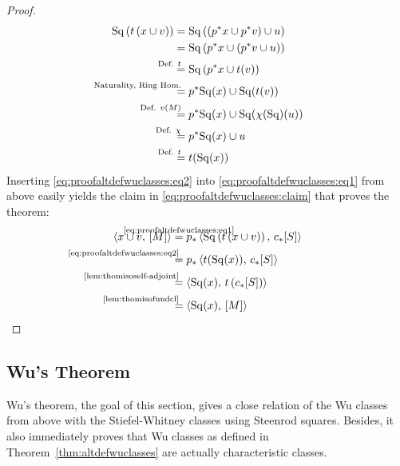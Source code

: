 \begin{Thm}
\begin{proof}
\begin{align}
      \SQ\left(\thomiso\left(x\cup\Vu\right)\right)
      &=
        \SQ\left(\left(\pb p x\cup \pb p\Vu\right) \cup \U\right)
      \\\notag
      &=
        \SQ\left(\pb p x\cup \left(\pb p\Vu \cup \U\right)\right)
      \\\notag
      &\equalsby{Def. $\thomiso$}
       \SQ\left(\pb p x\cup \thomiso(\Vu)\right)
      \\\notag
      &\equalsby{Naturality, Ring Hom.}
        \pb p\SQ(x) \cup \SQ(\thomiso(\Vu))
      \\\notag
      &\equalsby{Def. $\V{M}$}
        \pb p\SQ(x) \cup \SQ(\antipode(\SQ)(u))
      \\\notag
      &\equalsby{Def. $\antipode$}
        \pb p\SQ(x) \cup u
      \\\label{eq:proofaltdefwuclasses:eq2}
      &\equalsby{Def. $\thomiso$}
        \thomiso(\SQ(x))
    \end{align}
    Inserting \eqref{eq:proofaltdefwuclasses:eq2} into
    \eqref{eq:proofaltdefwuclasses:eq1} from above easily yields the
    claim in \eqref{eq:proofaltdefwuclasses:claim} that proves the theorem:
    \begin{align*}
      \capped{x\cup \Vu}{\fundcl M}
      &\cequalsby{\eqref{eq:proofaltdefwuclasses:eq1}}
        \pf p\capped
        {\SQ\left(\thomiso\left(x\cup\Vu\right)\right)}
        {\pf\collapse\fundcl{\Sph}}
      \\
      &\equalsby{\eqref{eq:proofaltdefwuclasses:eq2}}
        \pf p\capped
        {\thomiso(\SQ(x))}
        {\pf\collapse\fundcl{\Sph}}
      \\
      &\equalsby{\ref{lem:thomisoself-adjoint}}
        \capped
        {\SQ(x)}
        {\thomiso\left(\pf\collapse\fundcl{\Sph}\right)}
      \\
      &\equalsby{\ref{lem:thomisofundcl}}
        \capped
        {\SQ(x)}
        {\fundcl M}
        \qedhere
    \end{align*}
  \end{proof}
\end{Thm}


\subsection{Wu's Theorem}\label{sec:wutheorem}
Wu's theorem, the goal of this section, gives a close relation of
the Wu classes from above with the Stiefel-Whitney classes using
Steenrod squares. Besides, it also immediately proves that Wu classes
as defined in Theorem~\ref{thm:altdefwuclasses} are actually characteristic
classes.

